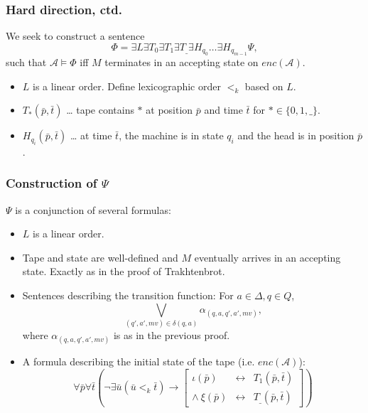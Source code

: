 \documentclass{beamer}
\newcommand{\A}{\mathcal{A}}
\begin{document}
\begin{frame}
	\frametitle{Hard direction, ctd.}
	We seek to construct a sentence
	\begin{equation*}
	Φ = ∃L ∃T_0 ∃T_1 ∃T_{\_} ∃H_{q_0} … ∃H_{q_{m-1}} Ψ,
	\end{equation*}
	such that $\A \vDash Φ$ iff $M$ terminates in an accepting state on $enc(\A)$.
	
	\medskip
	
	
	\medskip
	
	\begin{itemize}
	\item<3-> $L$ is a linear order. Define lexicographic order $<_k$ based on $L$.
	\item<4-> $T_{*}(\bar{p}, \bar{t})$ … tape contains $*$ at position $\bar{p}$ and time $\bar{t}$ for $* ∈ \{0, 1, \_\}$.
	\item<5-> $H_{q_i}(\bar{p},\bar{t})$ … at time $\bar{t}$, the machine is in state $q_{i}$ and the head is in position $\bar{p}$.
	\end{itemize}
\end{frame}

\begin{frame}
	\frametitle{Construction of $Ψ$}
	$Ψ$ is a conjunction of several formulas:
	\begin{itemize}
		\item<2-> $L$ is a linear order.
		\item<3-> Tape and state are well-defined and $M$ eventually arrives in an accepting state. Exactly as in the proof of Trakhtenbrot.
		\item<4-> Sentences describing the transition function: For $a ∈ Δ, q ∈ Q$,
		\begin{equation*}
		\bigvee_{(q',a',mv) ∈ δ(q,a)} α_{(q,a,q',a',mv)},
		\end{equation*}
		where $α_{(q,a,q',a',mv)}$ is as in the previous proof.
		\item<5-> A formula describing the initial state of the tape (i.e. $enc(\A)$):
		\begin{equation*}
		∀\bar{p}∀\bar{t}\left(¬∃\bar{u} (\bar{u} <_k \bar{t}) → \left[
		\begin{array}{rcl}
		ι(\bar{p})&\leftrightarrow&T_1(\bar{p},\bar{t})\\
		∧\ ξ(\bar{p})&\leftrightarrow&T_{\_}(\bar{p},\bar{t})
		\end{array}		
		\right]\right)
		\end{equation*}
	\end{itemize}
\end{frame}
\end{document}
